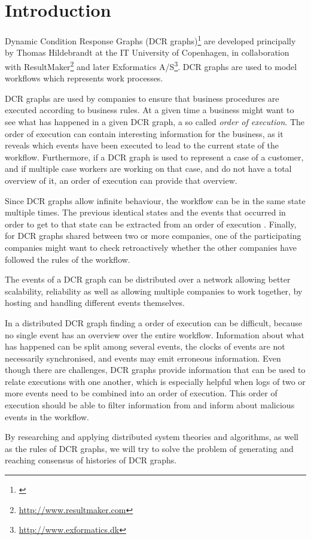 \chapter{Introduction}
	Dynamic Condition Response Graphs (DCR graphs)\footnote{\cite{hildebrandt2011declarative}} are developed principally by Thomas Hildebrandt at the IT University of Copenhagen, in collaboration with ResultMaker\footnote{\url{http://www.resultmaker.com}} and later Exformatics A/S\footnote{\url{http://www.exformatics.dk}}. DCR graphs are used to model workflows which represents work processes.
	
	\newpar DCR graphs are used by companies to ensure that business procedures are executed according to business rules. At a given time a business might want to see what has happened in a given DCR graph, a so called \textit{order of execution}. The order of execution can contain interesting information for the business, as it reveals which events have been executed to lead to the current state of the workflow. Furthermore, if a DCR graph is used to represent a case of a customer, and if multiple case workers are working on that case, and do not have a total overview of it, an order of execution can provide that overview. 
	
	Since DCR graphs allow infinite behaviour, the workflow can be in the same state multiple times. The previous identical states and the events that occurred in order to get to that state can be extracted from an order of execution . Finally, for DCR graphs shared between two or more companies, one of the participating companies might want to check retroactively whether the other companies have followed the rules of the workflow.
	
	\newpar The events of a DCR graph can be distributed over a network allowing better scalability, reliability as well as allowing multiple companies to work together, by hosting and handling different events themselves.
	
	\newpar In a distributed DCR graph finding a order of execution can be difficult, because no single event has an overview over the entire workflow. Information about what has happened can be split among several events, the clocks of events are not necessarily synchronised, and events may emit erroneous information. Even though there are challenges, DCR graphs provide information that can be used to relate executions with one another, which is especially helpful when logs of two or more events need to be combined into an order of execution. This order of execution should be able to filter information from and inform about malicious events in the workflow.

	
	\newpar By researching and applying distributed system theories and algorithms, as well as the rules of DCR graphs, we will try to solve the problem of generating and reaching consensus of histories of DCR graphs. 